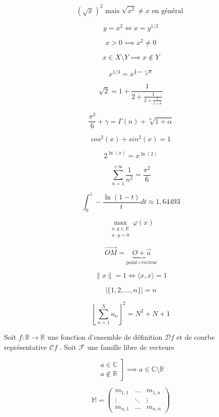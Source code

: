 \documentclass[12pt,a4paper]{scrartcl}
\theoremstyle{plain}
\begin{document}
\begin{equation*}
 (\sqrt{x})^2 \text{ mais } \sqrt{x^2} \neq x \text{ en général }
\end{equation*}

\begin{equation*}
	y = x^2 \iff x = y^{1/2}
\end{equation*}

\begin{equation*}
	x > 0 \implies x^2 \neq 0
\end{equation*}

\begin{equation*}
	x \in X \setminus Y \implies x \not \in Y
\end{equation*}

\begin{equation*}
	x^{1/3} = x^{\frac{1}{3} = \sqrt[3]{x}}
\end{equation*}

\begin{equation*}
	\sqrt{2} = 1 + \frac{1}{2+\frac{1}{2+\frac{1}{2+\frac{1}{\ddots}}}}
\end{equation*}

\[
	\frac{\pi^2}{6}+\gamma = \Gamma(n) + \sqrt[n]{1+\alpha}
\]

\[
	cos^2(x) + sin^2(x) = 1
\]

\[
	2^{\ln(x)} = x^{\ln(2)}
\]

\[
	\sum_{n=1}^{+\infty}\frac{1}{n^2} = \frac{\pi^2}{6}
\]

\[
	\int_{0}^{1}-\frac{\ln(1-t)}{t}dt \approx 1,64493
\]

\[
\max_{ \substack{x,y \in E \\x \cdot y=0}}\varphi(x)
\]

\[
	\overrightarrow{OM} = \underbrace{O+\vec{u}}_{\text{point+vecteur}}
\]

\[
	\lVert x\rVert = 1 \iff \langle x,x \rangle = 1
\]

\[
	\lvert \{1,2,\dots,n\}\rvert = n
\]

\[
	\left\lfloor \sum_{n=1}^{N} u_n \right\rfloor^2 = N^2+N+1
\]

Soit $f : \mathbb{R} \to \mathbb{R}$ une fonction d’ensemble de définition $\mathcal{D}f$ et de courbe représentative $\mathcal{C}f$ .
Soit $\mathcal{F}$ une famille libre de vecteurs

\[
	\left.\begin{array}{c}
		a \in \mathbb{C} \\
		a \not \in \mathbb{R}
	\end{array}\right]
	\implies a \in \mathbb{C} \setminus \mathbb{R}
\]

\[
	\mathbb{M} = 
	\begin{pmatrix}
		m_{1,1} & \dots & m_{1,n} \\
		\vdots & \ddots & \vdots \\
		m_{n,1} & \dots & m_{n,n}
	\end{pmatrix}
\]
\end{document}
